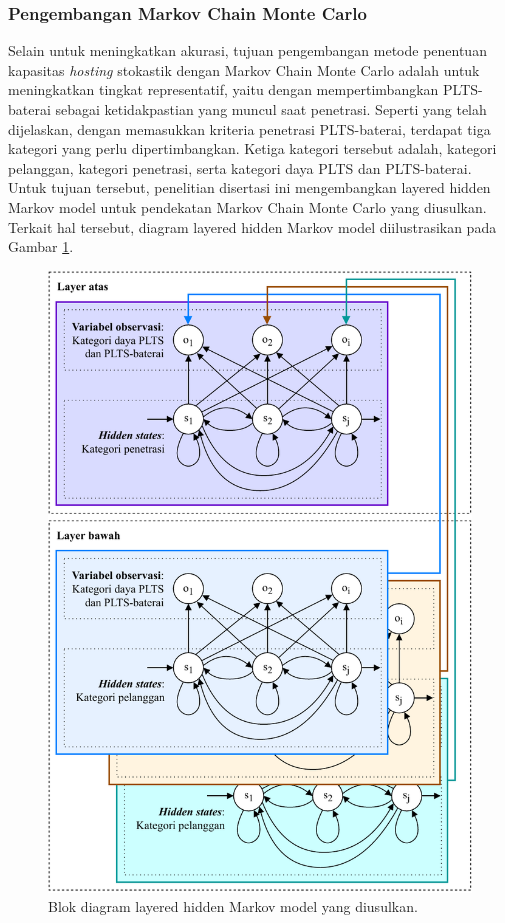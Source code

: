 {\subsubsection{Pengembangan Markov Chain Monte Carlo}
Selain untuk meningkatkan akurasi, tujuan pengembangan metode penentuan kapasitas \textit{\textit{hosting}} stokastik dengan Markov Chain Monte Carlo adalah untuk meningkatkan tingkat representatif, yaitu dengan mempertimbangkan PLTS-baterai sebagai ketidakpastian yang muncul saat penetrasi. Seperti yang telah dijelaskan, dengan memasukkan kriteria penetrasi PLTS-baterai, terdapat tiga kategori yang perlu dipertimbangkan. Ketiga kategori tersebut adalah, kategori pelanggan, kategori penetrasi, serta kategori daya PLTS dan PLTS-baterai. Untuk tujuan tersebut, penelitian disertasi ini mengembangkan layered hidden Markov model untuk pendekatan Markov Chain Monte Carlo yang diusulkan. Terkait hal tersebut, diagram layered hidden Markov model diilustrasikan pada Gambar \ref{lhmc}.
\begin{figure}[!h]
	\centering
	\includegraphics[width=1\textwidth]{Fig/lhmc}
	\caption{Blok diagram layered hidden Markov model yang diusulkan.}
	\label{lhmc}
\end{figure}

}
